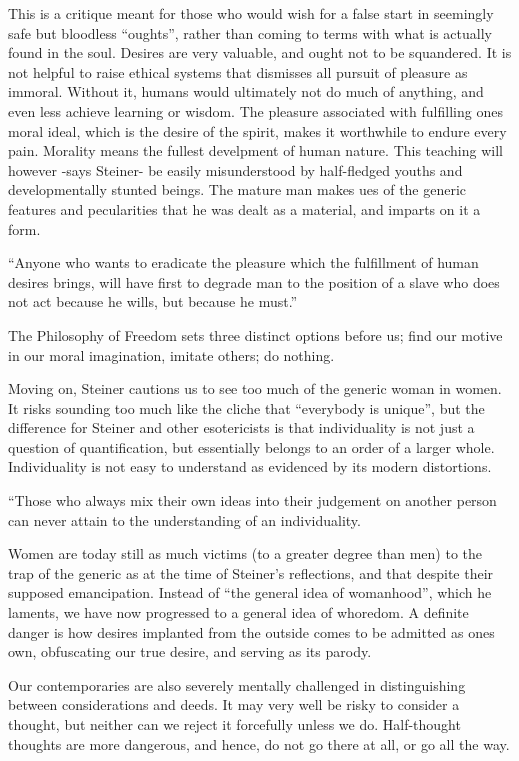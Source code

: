 \begin{footnotesize}
\begin{sffamily}
This is a critique meant for those who would wish for a false start in seemingly safe but bloodless ``oughts'', rather than coming to terms with what is actually found in the soul. Desires are very valuable, and ought not to be squandered. It is not helpful to raise ethical systems that dismisses all pursuit of pleasure as immoral. Without it, humans would ultimately not do much of anything, and even less achieve learning or wisdom. The pleasure associated with fulfilling ones moral ideal, which is the desire of the spirit, makes it worthwhile to endure every pain. Morality means the fullest develpment of human nature. This teaching will however -says Steiner- be easily misunderstood by half-fledged youths and developmentally stunted beings. The mature man makes ues of the generic features and pecularities that he was dealt as a material, and imparts on it a form.

``Anyone who wants to eradicate the pleasure which the fulfillment of human desires brings, will have first to degrade man to the position of a slave who does not act because he wills, but because he must.''

The Philosophy of Freedom sets three distinct options before us; find our motive in our moral imagination, imitate others; do nothing.

Moving on, Steiner cautions us to see too much of the generic woman in women. It risks sounding too much like the cliche that ``everybody is unique'', but the difference for Steiner and other esotericists is that individuality is not just a question of quantification, but essentially belongs to an order of a larger whole. Individuality is not easy to understand as evidenced by its modern distortions.

``Those who always mix their own ideas into their judgement on another person can never attain to the understanding of an individuality.

Women are today still as much victims (to a greater degree than men) to the trap of the generic as at the time of Steiner's reflections, and that despite their supposed emancipation. Instead of ``the general idea of womanhood'', which he laments, we have now progressed to a general idea of whoredom. A definite danger is how desires implanted from the outside comes to be admitted as ones own, obfuscating our true desire, and serving as its parody.

Our contemporaries are also severely mentally challenged in distinguishing between considerations and deeds. It may very well be risky to consider a thought, but neither can we reject it forcefully unless we do. Half-thought thoughts are more dangerous, and hence, do not go there at all, or go all the way.


\end{sffamily}
\end{footnotesize}
